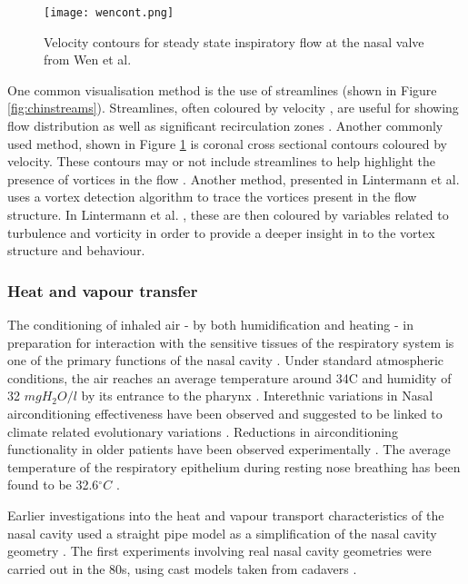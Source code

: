 \begin{figure}
  \centering
  \texttt{[image: wencont.png]}
  \caption{Velocity contours for steady state inspiratory flow at the nasal valve from Wen et al. \cite{Wen2008}} \label{fig:wencont}
\centering
\end{figure}

One common visualisation method is the use of streamlines (shown in Figure \ref{fig:chinstreams}). Streamlines, often coloured by velocity \cite{Wen2008, Zhu2011, Garcia2007}, are useful for showing flow distribution as well as significant recirculation zones \cite{Lintermann2013, Xi2014}. Another commonly used method, shown in Figure \ref{fig:wencont} is coronal cross sectional contours coloured by velocity. These contours may or not include streamlines to help highlight the presence of vortices in the flow \cite{Wen2008}. Another method, presented in Lintermann et al. \cite{Lintermann2013} uses a vortex detection algorithm to trace the vortices present in the flow structure. In Lintermann et al. \cite{Lintermann2013}, these are then coloured by variables related to turbulence and vorticity in order to provide a deeper insight in to the vortex structure and behaviour.

\subsubsection{Heat and vapour transfer}

The conditioning of inhaled air - by both humidification and heating - in preparation for interaction with the sensitive tissues of the respiratory system is one of the primary functions of the nasal cavity \cite{Elad2008}.
Under standard atmospheric conditions, the air reaches an average temperature around 34\degree C and humidity of 32 $mg H_2 O/l$ by its entrance to the pharynx \cite{Keck2000}.
Interethnic variations in Nasal airconditioning effectiveness have been observed and suggested to be linked to climate related evolutionary variations \cite{Noback2011, Yokley2009}.
Reductions in airconditioning functionality in older patients have been observed experimentally \cite{Lindemann2008}.
The average temperature of the respiratory epithelium during resting nose breathing has been found to be 32.6$^{\circ} C$ \cite{Lindemann2002}.

Earlier investigations into the heat and vapour transport characteristics of the nasal cavity used a straight pipe model as a simplification of the nasal cavity geometry \cite{Ingelstedt1961}. The first experiments involving real nasal cavity geometries were carried out in the 80s, using cast models taken from cadavers \cite{Nuckols1983}.

